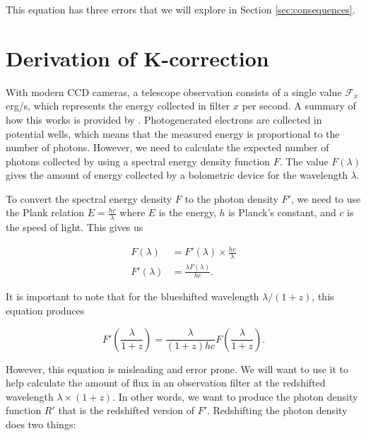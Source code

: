 \documentclass[linenumbers]{aastex631}
\begin{document}
This equation has three errors that we will explore in Section
\ref{sec:consequences}.

\section{Derivation of K-correction}
\label{sec:derivation}

With modern CCD cameras, a telescope observation consists of a single value
$\mathcal{F}_x$ erg/s, which represents the energy collected in filter $x$ per
second. A summary of how this works is provided by \citet{lesser2015}.
Photogenerated electrons are collected in potential wells, which means that the
measured energy is proportional to the number of photons. However, we need to
calculate the expected number of photons collected by using a spectral energy
density function $F$. The value $F(\lambda)$ gives the amount of energy
collected by a bolometric device for the wavelength $\lambda$.

To convert the spectral energy density $F$ to the photon density $F'$, we need
to use the Plank relation $E = \frac{hc}{\lambda}$ where $E$ is the energy, $h$
is Planck's constant, and $c$ is the speed of light. This gives us

\begin{equation}
\begin{aligned}
   F(\lambda) &= F'(\lambda) \times \frac{hc}{\lambda} \\
  F'(\lambda) &= \frac{\lambda F(\lambda)}{hc}.
\end{aligned}
\end{equation}

It is important to note that for the blueshifted wavelength $\lambda / (1+z)$,
this equation produces

\begin{equation}
 F'\left(\frac{\lambda}{1+z}\right) = \frac{\lambda}{(1+z)hc} F\left(\frac{\lambda}{1+z}\right).
\end{equation}

However, this equation is misleading and error prone. We will want to use it to
help calculate the amount of flux in an observation filter at the redshifted
wavelength $\lambda \times (1 + z)$. In other words, we want to produce the
photon density function $R'$ that is the redshifted version of $F'$.
Redshifting the photon density does two things:
\end{document}
